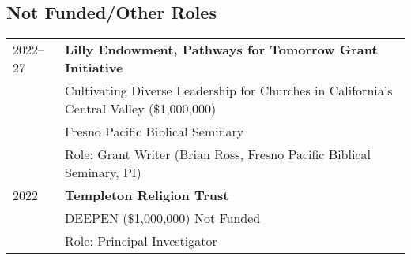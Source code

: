 \subsection*{Not Funded/Other Roles}
\begin{longtable}{p{} p{}}
2022--27 & \textbf{Lilly Endowment, Pathways for Tomorrow Grant Initiative} \\
& Cultivating Diverse Leadership for Churches in California’s Central Valley (\$1,000,000)\\
& Fresno Pacific Biblical Seminary\\
& Role: Grant Writer (Brian Ross, Fresno Pacific Biblical Seminary, PI)\\
2022 & \textbf{Templeton Religion Trust} \\
& DEEPEN (\$1,000,000) Not Funded \\
& Role: Principal Investigator\\
\end{longtable}